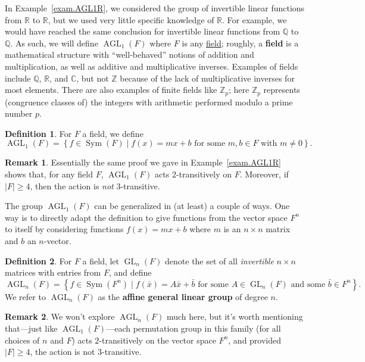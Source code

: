 \documentclass[11pt]{amsart}
\theoremstyle{plain}
\theoremstyle{definition}
\newtheorem*{definition*}{Definition}
\newtheorem*{remark*}{Remark}
\theoremstyle{remark}
\DeclareMathOperator{\Sym}{Sym}
\DeclareMathOperator{\GL}{GL}
\DeclareMathOperator{\AGL}{AGL}
\begin{document}
In Example~\ref{exam.AGL1R}, we considered the group of invertible linear functions from $\mathbb{R}$ to $\mathbb{R}$, but we used very little specific knowledge of $\mathbb{R}$. For example, we would have reached the same conclusion for invertible linear functions from $\mathbb{Q}$ to $\mathbb{Q}$. As such, we will define $\AGL_1(F)$ where $F$ is any \href{https://en.wikipedia.org/wiki/Field_(mathematics)}{field}; roughly, a \textbf{field} is a mathematical structure with ``well-behaved'' notions of addition and multiplication, as well as additive and multiplicative inverses. Examples of fields include $\mathbb{Q}$, $\mathbb{R}$, and $\mathbb{C}$, but not $\mathbb{Z}$ because of the lack of multiplicative inverses for most elements. There are also  examples of finite fields like $\mathbb{Z}_p$; here $\mathbb{Z}_p$ represents (congruence classes of) the integers with arithmetic performed modulo a prime number $p$.

\begin{definition*}
For $F$ a field, we define \[\AGL_1(F) = \left\{ f \in \Sym(F) \mid \text{$f(x) = mx+b$ for some $m,b\in F$ with $m\neq 0$}\right\}.\]
\end{definition*}

\begin{remark*}
Essentially the same proof we gave in Example~\ref{exam.AGL1R} shows that, for any field $F$, $\AGL_1(F)$ acts $2$-transitively on $F$. Moreover, if $|F| \ge 4$, then the action is \emph{not} $3$-transitive. 
\end{remark*}

The group $\AGL_1(F)$ can be generalized in (at least) a couple of ways. One way is to directly adapt the definition to give functions from the vector space $F^n$ to itself by considering functions $f(x) = mx+b$ where $m$ is an $n\times n$ matrix and $b$ an $n$-vector. 

\begin{definition*}
For $F$ a field, let $\GL_{n}(F)$ denote the set of all \emph{invertible} $n\times n$ matrices with entries from $F$, and define
\[\AGL_n(F) = \left\{ f \in \Sym(F^n) \mid \text{$f(\bar{x}) = A\bar{x}+\bar{b}$ for some $A\in \GL_{n}(F)$ and some $\bar{b} \in F^n$}\right\}.\]
We refer to $\AGL_n(F)$ as the \textbf{affine general linear group} of degree $n$.
\end{definition*}

\begin{remark*}
We won't explore $\AGL_n(F)$ much here, but it's worth mentioning that---just like $\AGL_1(F)$---each permutation group in this family (for all choices of $n$ and $F$) acts  $2$-transitively on the vector space $F^n$, and provided $|F| \ge 4$, the action is not $3$-transitive.
\end{remark*}
\end{document}
